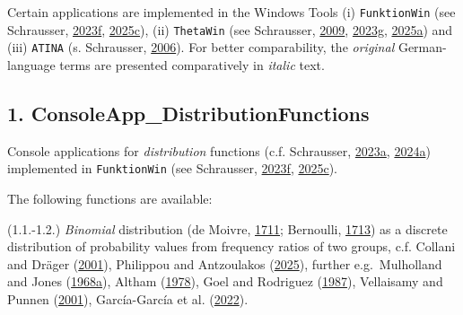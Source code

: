 \documentclass[
]{article}
\begin{document}
Certain applications are implemented in the Windows Tools (i)
\texttt{FunktionWin} (see Schrausser,
\href{https://doi.org/10.5281/zenodo.7651661}{2023f},
\href{https://doi.org/10.5281/zenodo.17880113}{2025c}), (ii)
\texttt{ThetaWin} (see Schrausser,
\href{https://www.academia.edu/81800920}{2009},
\href{https://doi.org/10.5281/zenodo.7659264}{2023g},
\href{https://doi.org/10.5281/zenodo.17880113}{2025a}) and (iii)
\texttt{ATINA} (s. Schrausser,
\href{https://doi.org/10.5281/zenodo.19422127}{2006}). For better
comparability, the \emph{original} German-language terms are presented
comparatively in \emph{italic} text.

\hypertarget{consoleapp_distributionfunctions}{%
\subsection{1.
ConsoleApp\_DistributionFunctions}\label{consoleapp_distributionfunctions}}

Console applications for \emph{distribution} functions (c.f. Schrausser,
\href{https://doi.org/10.5281/zenodo.7664141}{2023a},
\href{https://doi.org/10.31234/osf.io/rvzxa}{2024a}) implemented in
\texttt{FunktionWin} (see Schrausser,
\href{https://doi.org/10.5281/zenodo.7651661}{2023f},
\href{https://doi.org/10.5281/zenodo.17880113}{2025c}).

The following functions are available:

(1.1.-1.2.) \emph{Binomial} distribution (de Moivre,
\href{https://doi.org/10.1098/rstl.1710.0018}{1711}; Bernoulli,
\href{https://www.e-rara.ch/zut/doi/10.3931/e-rara-9001}{1713}) as a
discrete distribution of probability values from frequency ratios of two
groups, c.f. Collani and Dräger
(\href{https://doi.org/10.1007/978-1-4612-0215-8}{2001}), Philippou and
Antzoulakos (\href{https://doi.org/10.1007/978-3-662-69359-9_71}{2025}),
further e.g.~Mulholland and Jones
(\href{https://doi.org/10.1007/978-1-4899-6507-3_3}{1968a}), Altham
(\href{http://www.jstor.org/stable/2346943}{1978}), Goel and Rodriguez
(\href{http://www.jstor.org/stable/2689344}{1987}), Vellaisamy and
Punnen (\href{http://www.jstor.org/stable/3215739}{2001}), García-García
et al. (\href{https://doi.org/10.3390/math10152680}{2022}).
\end{document}
